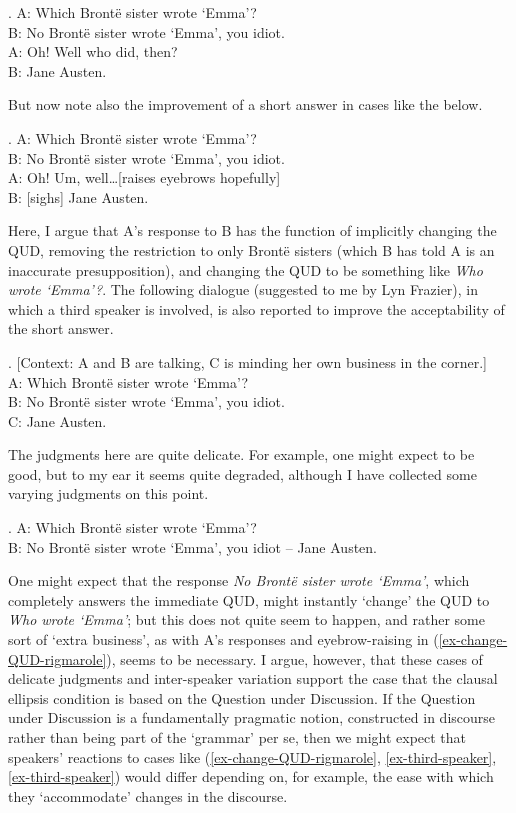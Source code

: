 \documentclass[11pt,letterpaper]{article}
\begin{document}
\ex. 	A: Which Bront\"e sister wrote `Emma'?\\
	B: No Bront\"e sister wrote `Emma', you idiot.\\
	A: Oh! Well who did, then?\\
	B: Jane Austen.
	
But now note also the improvement of a short answer in cases like the below.

\ex. 	A: Which Bront\"e sister wrote `Emma'?\\\label{ex-change-QUD-rigmarole}
	B: No Bront\"e sister wrote `Emma', you idiot.\\
	A: Oh! Um, well\ldots [raises eyebrows hopefully]\\
	B: [sighs] Jane Austen.
	
Here, I argue that A's response to B has the function of implicitly changing the QUD, removing the restriction to only Bront\"e sisters (which B has told A is an inaccurate presupposition), and changing the QUD to be something like {\it Who wrote `Emma'?}.
The following dialogue (suggested to me by Lyn Frazier), in which a third speaker is involved, is also reported to improve the acceptability of the short answer.

\ex. 	[Context: A and B are talking, C is minding her own business in the corner.]\\\label{ex-third-speaker}
	A: Which Bront\"e sister wrote `Emma'?\\
	B: No Bront\"e sister wrote `Emma', you idiot.\\
	C: Jane Austen.
	
The judgments here are quite delicate.
For example, one might expect \Next to be good, but to my ear it seems quite degraded, although I have collected some varying judgments on this point.

\ex. 	A: Which Bront\"e sister wrote `Emma'?\\\label{ex-immediate-QUD-change}
	B: No Bront\"e sister wrote `Emma', you idiot -- Jane Austen.
	
One might expect that the response {\it No Bront\"e sister wrote `Emma'}, which completely answers the immediate QUD, might instantly `change' the QUD to {\it Who wrote `Emma'}; but this does not quite seem to happen, and rather some sort of `extra business', as with A's responses and eyebrow-raising in (\ref{ex-change-QUD-rigmarole}), seems to be necessary.
I argue, however, that these cases of delicate judgments and inter-speaker variation support the case that the clausal ellipsis condition is based on the Question under Discussion.
If the Question under Discussion is a fundamentally pragmatic notion, constructed in discourse rather than being part of the `grammar' per se, then we might expect that speakers' reactions to cases like (\ref{ex-change-QUD-rigmarole}, \ref{ex-third-speaker}, \ref{ex-third-speaker})  would differ depending on, for example, the ease with which they `accommodate' changes in the discourse.
\end{document}
